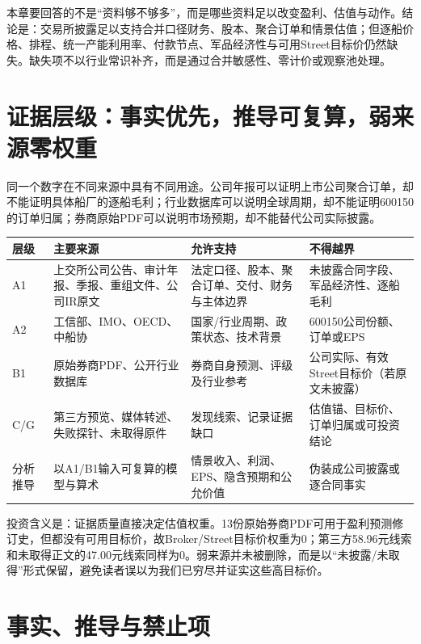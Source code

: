 本章要回答的不是“资料够不够多”，而是哪些资料足以改变盈利、估值与动作。结论是：交易所披露足以支持合并口径财务、股本、聚合订单和情景估值；但逐船价格、排程、统一产能利用率、付款节点、军品经济性与可用Street目标价仍然缺失。缺失项不以行业常识补齐，而是通过合并敏感性、零计价或观察池处理。

\section{证据层级：事实优先，推导可复算，弱来源零权重}

同一个数字在不同来源中具有不同用途。公司年报可以证明上市公司聚合订单，却不能证明具体船厂的逐船毛利；行业数据库可以说明全球周期，却不能证明600150的订单归属；券商原始PDF可以说明市场预期，却不能替代公司实际披露。

\begin{exhibitbox}[证据金字塔与允许用途]
\small
\begin{tabularx}{\exhibitboxwidth}{L{2.3cm}L{3.7cm}L{4.0cm}X}
\toprule
\textbf{层级} & \textbf{主要来源} & \textbf{允许支持} & \textbf{不得越界} \\
\midrule
A1 & 上交所公司公告、审计年报、季报、重组文件、公司IR原文 & 法定口径、股本、聚合订单、交付、财务与主体边界 & 未披露合同字段、军品经济性、逐船毛利 \\
A2 & 工信部、IMO、OECD、中船协 & 国家/行业周期、政策状态、技术背景 & 600150公司份额、订单或EPS \\
B1 & 原始券商PDF、公开行业数据库 & 券商自身预测、评级及行业参考 & 公司实际、有效Street目标价（若原文未披露） \\
C/G & 第三方预览、媒体转述、失败探针、未取得原件 & 发现线索、记录证据缺口 & 估值锚、目标价、订单归属或可投资结论 \\
分析推导 & 以A1/B1输入可复算的模型与算术 & 情景收入、利润、EPS、隐含预期和公允价值 & 伪装成公司披露或逐合同事实 \\
\bottomrule
\end{tabularx}
\end{exhibitbox}

投资含义是：证据质量直接决定估值权重。13份原始券商PDF可用于盈利预测修订史，但都没有可用目标价，故Broker/Street目标价权重为0；第三方58.96元线索和未取得正文的47.00元线索同样为0。弱来源并未被删除，而是以“未披露/未取得”形式保留，避免读者误以为我们已穷尽并证实这些高目标价。

\section{事实、推导与禁止项}

